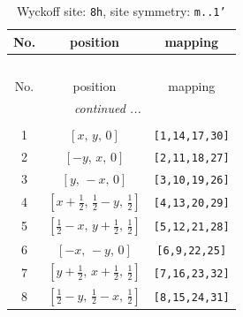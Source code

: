 \documentclass[fleqn,8pt]{jsarticle}
\begin{document}
\begin{longtable}{ccc}
\caption{Wyckoff site: {\tt 8h}, site symmetry: {\tt m..1'}}
 \\
 \hline \hline
No. & position & mapping \\ \hline \endfirsthead

\multicolumn{2}{l}{\tablename\ \thetable{}} \\
 \hline \hline
No. & position & mapping \\ \hline \endhead

 \hline \hline
\multicolumn{2}{r}{\footnotesize\it continued ...} \\ \endfoot

 \hline \hline
\multicolumn{2}{r}{} \\ \endlastfoot

1 & $\left[ x,\, y,\, 0 \right]$ & {\tt [1,14,17,30]} \\ \hline
2 & $\left[ - y,\, x,\, 0 \right]$ & {\tt [2,11,18,27]} \\ \hline
3 & $\left[ y,\, - x,\, 0 \right]$ & {\tt [3,10,19,26]} \\ \hline
4 & $\left[ x + \frac{1}{2},\, \frac{1}{2} - y,\, \frac{1}{2} \right]$ & {\tt [4,13,20,29]} \\ \hline
5 & $\left[ \frac{1}{2} - x,\, y + \frac{1}{2},\, \frac{1}{2} \right]$ & {\tt [5,12,21,28]} \\ \hline
6 & $\left[ - x,\, - y,\, 0 \right]$ & {\tt [6,9,22,25]} \\ \hline
7 & $\left[ y + \frac{1}{2},\, x + \frac{1}{2},\, \frac{1}{2} \right]$ & {\tt [7,16,23,32]} \\ \hline
8 & $\left[ \frac{1}{2} - y,\, \frac{1}{2} - x,\, \frac{1}{2} \right]$ & {\tt [8,15,24,31]} \\
\end{longtable}
\renewcommand{\arraystretch}{1.2}
\end{document}
